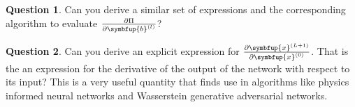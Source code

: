 \documentclass[11pt]{extarticle}
\newcommand{\vx}{\symbfup{x}}
\newcommand{\vb}{\symbfup{b}}
\newcommand{\vW}{\symbfup{W}}
\theoremstyle{definition}
\newcommand{\df}[2]{\frac{\partial #1}{\partial #2}}
\newtheorem{question}{Question}%
\begin{document}

\begin{question}
  Can you derive a similar set of expressions and the corresponding algorithm to evaluate $\df{\Pi}{\vb^{(l)}}$?
\end{question}

\begin{question}
  Can you derive an explicit expression for $\df{\vx^{(L+1)}}{\vx^{(0)}}$. That is the an expression for the derivative of the output of the network with respect to its input? This is a very useful quantity that finds use in algorithms like physics informed neural networks and Wasserstein generative adversarial networks. 
\end{question}
\end{document}
